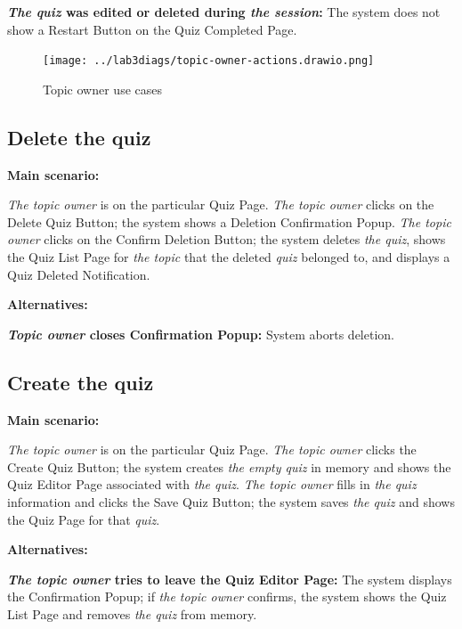 \documentclass[
    english, %
]{VUMIFPSkursinis}
\begin{document}
\textbf{\textit{The quiz} was edited or deleted during \textit{the session}:} The system does not show a Restart Button on the Quiz Completed Page.

\begin{figure}[ht]
    \centering
    \texttt{[image: ../lab3diags/topic-owner-actions.drawio.png]}
    \caption{Topic owner use cases}
    \label{topic-owner}
\end{figure}

\subsection{Delete the quiz}

\noindent\textbf{\fontsize{13}{15}\selectfont Main scenario:}

\textit{The topic owner} is on the particular Quiz Page. \textit{The topic owner} clicks on the Delete Quiz Button; the system shows a Deletion Confirmation Popup. \textit{The topic owner} clicks on the Confirm Deletion Button; the system deletes \textit{the quiz}, shows the Quiz List Page for \textit{the topic} that the deleted \textit{quiz} belonged to, and displays a Quiz Deleted Notification.

\noindent\textbf{\fontsize{13}{15}\selectfont Alternatives:}

\textbf{\textit{Topic owner} closes Confirmation Popup:} System aborts deletion.

\subsection{Create the quiz}

\noindent\textbf{\fontsize{13}{15}\selectfont Main scenario:}

\textit{The topic owner} is on the particular Quiz Page. \textit{The topic owner} clicks the Create Quiz Button; the system creates \textit{the empty quiz} in memory and shows the Quiz Editor Page associated with \textit{the quiz}. \textit{The topic owner} fills in \textit{the quiz} information and clicks the Save Quiz Button; the system saves \textit{the quiz} and shows the Quiz Page for that \textit{quiz}.

\noindent\textbf{\fontsize{13}{15}\selectfont Alternatives:}

\textbf{\textit{The topic owner} tries to leave the Quiz Editor Page:} The system displays the Confirmation Popup; if \textit{the topic owner} confirms, the system shows the Quiz List Page and removes \textit{the quiz} from memory.
\end{document}
